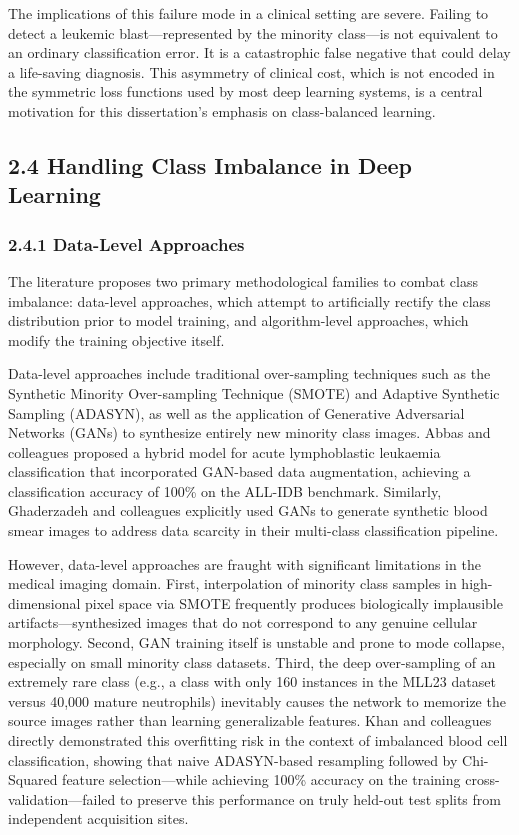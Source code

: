 \documentclass[11pt]{article}
\begin{document}
The implications of this failure mode in a clinical setting are severe. Failing to detect a leukemic blast—represented by the minority class—is not equivalent to an ordinary classification error. It is a catastrophic false negative that could delay a life-saving diagnosis. This asymmetry of clinical cost, which is not encoded in the symmetric loss functions used by most deep learning systems, is a central motivation for this dissertation's emphasis on class-balanced learning.

\subsection*{2.4 Handling Class Imbalance in Deep Learning}

\subsubsection*{2.4.1 Data-Level Approaches}

The literature proposes two primary methodological families to combat class imbalance: data-level approaches, which attempt to artificially rectify the class distribution prior to model training, and algorithm-level approaches, which modify the training objective itself.

Data-level approaches include traditional over-sampling techniques such as the Synthetic Minority Over-sampling Technique (SMOTE) and Adaptive Synthetic Sampling (ADASYN), as well as the application of Generative Adversarial Networks (GANs) to synthesize entirely new minority class images. Abbas and colleagues \cite{abbas2021} proposed a hybrid model for acute lymphoblastic leukaemia classification that incorporated GAN-based data augmentation, achieving a classification accuracy of 100\% on the ALL-IDB benchmark. Similarly, Ghaderzadeh and colleagues \cite{ghaderzadeh2021} explicitly used GANs to generate synthetic blood smear images to address data scarcity in their multi-class classification pipeline.

However, data-level approaches are fraught with significant limitations in the medical imaging domain. First, interpolation of minority class samples in high-dimensional pixel space via SMOTE frequently produces biologically implausible artifacts—synthesized images that do not correspond to any genuine cellular morphology. Second, GAN training itself is unstable and prone to mode collapse, especially on small minority class datasets. Third, the deep over-sampling of an extremely rare class (e.g., a class with only 160 instances in the MLL23 dataset versus 40,000 mature neutrophils) inevitably causes the network to memorize the source images rather than learning generalizable features. Khan and colleagues \cite{khan2022} directly demonstrated this overfitting risk in the context of imbalanced blood cell classification, showing that naive ADASYN-based resampling followed by Chi-Squared feature selection—while achieving 100\% accuracy on the training cross-validation—failed to preserve this performance on truly held-out test splits from independent acquisition sites.
\end{document}
